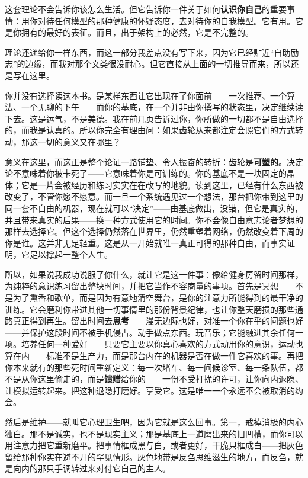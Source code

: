 \documentclass[11pt, twoside, openright]{book}
\begin{document}
这套理论不会告诉你该怎么生活。但它告诉你一件关于如何\textbf{认识你自己}的重要事情：用你对待任何模型的那种健康的怀疑态度，去对待你的自我模型。它有用。它是你拥有的最好的表征。而且，出于架构上的必然，它是不完整的。

理论还递给你一样东西，而这一部分我差点没有写下来，因为它已经贴近“自助励志”的边缘，而我对那个文类很没耐心。但它直接从上面的一切推导而来，所以还是写在这里。

你并没有选择读这本书。是某样东西让它出现在了你面前------一次推荐、一个算法、一个无聊的下午------而你的基底，在一个并非由你撰写的状态里，决定继续读下去。这是运气，不是美德。我在前几页告诉过你，你所做的一切都不是自由选择的，而我是认真的。所以你完全有理由问：如果齿轮从来都注定会照它们的方式转动，那这一切的意义又在哪里？

意义在这里，而这正是整个论证一路铺垫、令人振奋的转折：齿轮是\textbf{可塑的}。决定论不意味着你被卡死了------它意味着你是可训练的。你的基底不是一块固定的晶体；它是一片会被经历和练习实实在在改写的地貌。读到这里，已经有什么东西被改变了，不管你愿不愿意。而一旦一个系统遇见过一个想法，那台把你带到这里的同一套不自由的机器，现在就可以“决定”------由基底做出，没错，但它是真实的，并且带来真实的后果------换一种方式使用它的时间。你不会像自由意志论者梦想的那样去选择它。但这个选择仍然落在世界里，仍然重塑着网络，仍然改变着下周的你是谁。这并非无足轻重。这是从一开始就唯一真正可得的那种自由，而事实证明，它足以撑起一整个人生。

所以，如果说我成功说服了你什么，就让它是这一件事：像给健身房留时间那样，为纯粹的意识练习留出整块时间，并把它当作不容商量的事项。首先是冥想------不是为了熏香和歌单，而是因为有意地清空舞台，是你的注意力所能得到的最干净的训练。它会磨利你带进其他一切事情里的那份背景纪律，也让你整天磨损的那些通路真正得到再生。留出时间去\textbf{思考}------漫无边际也好，对准一个你在乎的问题也好------并保护这段时间不被手机侵占。动手做点东西。玩音乐；它能融进其余任何一项。培养任何一种爱好------只要它主要以你真心喜欢的方式动用你的意识，运动也算在内------标准不是生产力，而是那台内在的机器是否在做一件它喜欢的事。再把你本来就有的那些死时间重新定义：每一次堵车、每一间候诊室、每一条队伍，都不是从你这里偷走的，而是\textbf{馈赠}给你的------一份不受打扰的许可，让你向内退隐、让模拟运转起来。把这种退隐打磨好。享受它。这是唯一一个永远不会被取消的约会。

然后是维护------就叫它心理卫生吧，因为它就是这么回事。第一，戒掉消极的内心独白。那不是诚实，也不是现实主义；那是基底上一道磨出来的旧凹槽，而你可以用注意力把它重新磨平。把事情框成黑与白，或者更好，干脆只框成白------把灰色留给那种你实在避不开的罕见情形。灰色地带是反刍思维滋生的地方，而反刍，就是向内的那只手调转过来对付它自己的主人。
\end{document}
